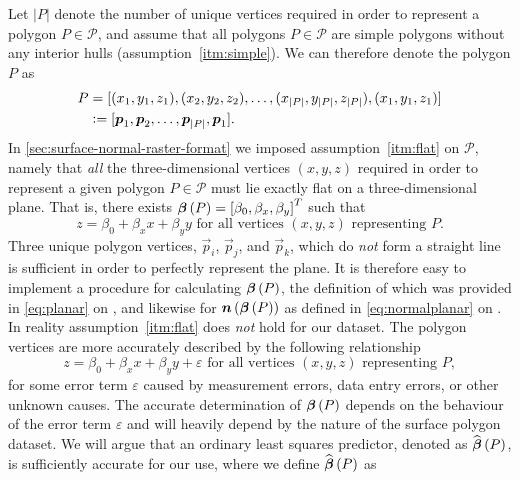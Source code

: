 Let $|P|$ denote the number of unique vertices required in order to represent a polygon $P \in \mathcal{P}$, and assume that all polygons $P \in \mathcal{P}$ are simple polygons without any interior hulls (assumption~\ref{itm:simple}).
We can therefore denote the polygon $P$ as
\begin{align*}
  P
  &=
  [(x_1, y_1, z_1), (x_2, y_2, z_2), \dots, (x_{|P|}, y_{|P|}, z_{|P|}), (x_1, y_1, z_1)]
  \\
  &\vcentcolon=
  [\boldsymbol{p}_1, \boldsymbol{p}_2, \ldots, \boldsymbol{p}_{|P|}, \boldsymbol{p}_1].
\end{align*}
In \cref{sec:surface-normal-raster-format} we imposed assumption~\ref{itm:flat} on $\mathcal{P}$, namely that \emph{all} the three-dimensional vertices $(x, y, z)$ required in order to represent a given polygon $P \in \mathcal{P}$ must lie exactly flat on a three-dimensional plane.
That is, there exists $\boldsymbol{\beta}\left(P\right) = {[\beta_0, \beta_x, \beta_y]}^T$ such that
%
\begin{equation*}
  z = \beta_0 + \beta_x x + \beta_y y
  \text{ for all vertices } (x, y, z) \text{ representing } P.
\end{equation*}
%
Three unique polygon vertices, $\vec{p}_i$, $\vec{p}_j$, and $\vec{p}_k$, which do \emph{not} form a straight line is sufficient in order to perfectly represent the plane.
It is therefore easy to implement a procedure for calculating $\boldsymbol{\beta}\left(P\right)$, the definition of which was provided in \cref{eq:planar} on , and likewise for $\boldsymbol{n}\left(\boldsymbol{\beta}\left(P\right)\right)$ as defined in \cref{eq:normalplanar} on .
In reality assumption~\ref{itm:flat} does \emph{not} hold for our dataset.
The polygon vertices are more accurately described by the following relationship
%
\begin{equation*}
  z = \beta_{0} + \beta_{x} x + \beta_{y} y + \varepsilon
  \text{ for all vertices } (x, y, z) \text{ representing } P,
\end{equation*}
%
for some error term $\varepsilon$ caused by measurement errors, data entry errors, or other unknown causes.
The accurate determination of $\boldsymbol{\beta}\left(P\right)$ depends on the behaviour of the error term $\varepsilon$ and will heavily depend by the nature of the surface polygon dataset.
We will argue that an ordinary least squares predictor, denoted as $\widehat{\boldsymbol{\beta}}\left(P\right)$, is sufficiently accurate for our use, where we define $\widehat{\boldsymbol{\beta}}\left(P\right)$ as
